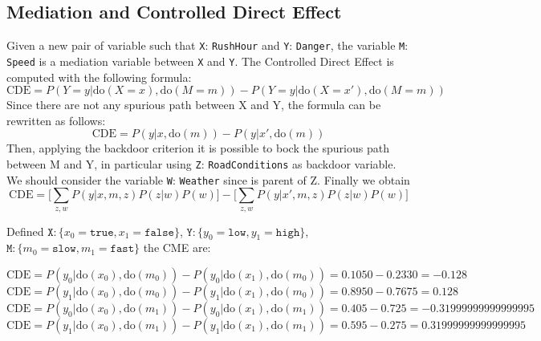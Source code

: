 \documentclass[a4paper,12pt]{article} %
\begin{document}
\subsection*{Mediation and Controlled Direct Effect}
Given a new pair of variable such that \texttt{X}: \texttt{RushHour} and \texttt{Y}: \texttt{Danger}, the variable \texttt{M}: \texttt{Speed} is a mediation variable between \texttt{X} and \texttt{Y}.
The Controlled Direct Effect is computed with the following formula:
\begin{equation}
	\text{CDE} = P(Y = y|\mathrm{do}(X = x),\mathrm{do}(M = m)) - P(Y = y|\mathrm{do}(X = x'),\mathrm{do}(M = m))
\end{equation}
Since there are not any spurious path between X and Y, the formula can be rewritten as follows:
\begin{equation*}
\text{CDE} = P(y| x,\mathrm{do}( m)) - P(y|x',\mathrm{do}(m))
\end{equation*}
Then, applying the backdoor criterion it is possible to bock the spurious path between M and Y, in particular using \texttt{Z}: \texttt{RoadConditions} as backdoor variable. We should consider the variable \texttt{W}: \texttt{Weather} since is parent of Z.
Finally we obtain
\begin{equation*}
\text{CDE} = \bigg[\sum_{z,w}P(y| x,m, z)P(z|w)P(w)\bigg] - \bigg[\sum_{z,w}P(y| x',m, z)P(z|w)P(w)\bigg]
\end{equation*}

Defined $\mathtt{X}: \{ x_0=\mathtt{true}, x_1=\mathtt{false}\}$, $\mathtt{Y}: \{ y_0=\mathtt{low}, y_1=\mathtt{high}\}$, $\mathtt{M}: \{ m_0=\mathtt{slow}, m_1=\mathtt{fast}\}$ the CME are: 

\begin{equation*}
\text{CDE} = P(y_0|\mathrm{do}(x_0),\mathrm{do}(m_0)) - P(y_0|\mathrm{do}(x_1),\mathrm{do}(m_0)) = 0.1050 - 0.2330 = -0.128
\end{equation*}
\begin{equation*}
\text{CDE} = P(y_1|\mathrm{do}(x_0),\mathrm{do}(m_0)) - P(y_1|\mathrm{do}(x_1),\mathrm{do}(m_0))=0.8950 - 0.7675 = 0.128
\end{equation*}
\begin{equation*}
\text{CDE} = P(y_0|\mathrm{do}(x_0),\mathrm{do}(m_1)) - P(y_0|\mathrm{do}(x_1),\mathrm{do}(m_1))=0.405 - 0.725 = -0.31999999999999995
\end{equation*}
\begin{equation*}
\text{CDE} = P(y_1|\mathrm{do}(x_0),\mathrm{do}(m_1)) - P(y_1|\mathrm{do}(x_1),\mathrm{do}(m_1))=0.595 - 0.275 = 0.31999999999999995
\end{equation*}
\end{document}
